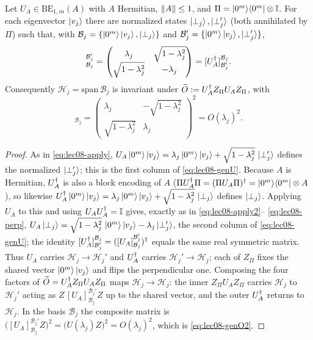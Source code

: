 \begin{lemma}
\label{lem:lec08-general}
Let $U_A\in\mathrm{BE}_{1,m}(A)$ with $A$ Hermitian, $\left\lVert A \right\rVert\le1$, and
$\Pi=\ket{0^m}\!\bra{0^m}\otimes\mathbb{I}$. For each eigenvector $\ket{v_j}$ there are normalized
states $\ket{\perp_j},\ket{\perp_j'}$ (both annihilated by $\Pi$) such that, with
$\mathcal B_j=\{\ket{0^m}\ket{v_j},\ket{\perp_j}\}$ and
$\mathcal B_j'=\{\ket{0^m}\ket{v_j},\ket{\perp_j'}\}$,
\begin{equation}
  [U_A]^{\mathcal B_j'}_{\mathcal B_j}
  =\begin{pmatrix}\lambda_j&\sqrt{1-\lambda_j^2}\\[2pt]
    \sqrt{1-\lambda_j^2}&-\lambda_j\end{pmatrix}
  =[U_A\dg]^{\mathcal B_j}_{\mathcal B_j'}.
  \label{eq:lec08-genU}
\end{equation}
Consequently $\mathcal H_j=\mathrm{span}\,\mathcal B_j$ is invariant under
$\widetilde O\vcentcolon= U_A^{\dagger} Z_\Pi U_A Z_\Pi$, with
\begin{equation}
  [\widetilde O]_{\mathcal B_j}
  =\begin{pmatrix}\lambda_j&-\sqrt{1-\lambda_j^2}\\[2pt]
    \sqrt{1-\lambda_j^2}&\lambda_j\end{pmatrix}^{\!2}
  =O(\lambda_j)^2 .
  \label{eq:lec08-genO2}
\end{equation}
\end{lemma}

\begin{proof}
As in \eqref{eq:lec08-apply}, $U_A\ket{0^m}\ket{v_j}=\lambda_j\ket{0^m}\ket{v_j}
+\sqrt{1-\lambda_j^2}\,\ket{\perp_j'}$ defines the normalized $\ket{\perp_j'}$; this
is the first column of \eqref{eq:lec08-genU}. Because $A$ is Hermitian, $U_A^{\dagger}$ is
also a block encoding of $A$ ($\Pi U_A^{\dagger}\Pi=(\Pi U_A\Pi)^{\dagger}=\ket{0^m}\!\bra{0^m}\otimes A$),
so likewise $U_A^{\dagger}\ket{0^m}\ket{v_j}=\lambda_j\ket{0^m}\ket{v_j}
+\sqrt{1-\lambda_j^2}\,\ket{\perp_j}$ defines $\ket{\perp_j}$. Applying $U_A$ to this
and using $U_A U_A^{\dagger}=\mathbb{I}$ gives, exactly as in \eqref{eq:lec08-apply2}--
\eqref{eq:lec08-perp}, $U_A\ket{\perp_j}=\sqrt{1-\lambda_j^2}\,\ket{0^m}\ket{v_j}
-\lambda_j\ket{\perp_j'}$, the second column of \eqref{eq:lec08-genU}; the identity
$[U_A^{\dagger}]^{\mathcal B_j}_{\mathcal B_j'}=([U_A]^{\mathcal B_j'}_{\mathcal B_j})^{\dagger}$
equals the same real symmetric matrix. Thus $U_A$ carries
$\mathcal H_j\to\mathcal H_j'$ and $U_A^{\dagger}$ carries $\mathcal H_j'\to\mathcal H_j$;
each of $Z_\Pi$ fixes the shared vector $\ket{0^m}\ket{v_j}$ and flips the
perpendicular one. Composing the four factors of $\widetilde O=U_A^{\dagger} Z_\Pi U_A Z_\Pi$ maps
$\mathcal H_j\to\mathcal H_j$: the inner $Z_\Pi U_A Z_\Pi$ carries $\mathcal H_j$ to
$\mathcal H_j'$ acting as $Z\,[U_A]^{\mathcal B_j'}_{\mathcal B_j}Z$ up to the shared
vector, and the outer $U_A^{\dagger}$ returns to $\mathcal H_j$. In the basis $\mathcal B_j$
the composite matrix is $\bigl([U_A]^{\mathcal B_j'}_{\mathcal B_j}Z\bigr)^2
=\bigl(U(\lambda_j)Z\bigr)^2=O(\lambda_j)^2$, which is
\eqref{eq:lec08-genO2}.
\end{proof}

